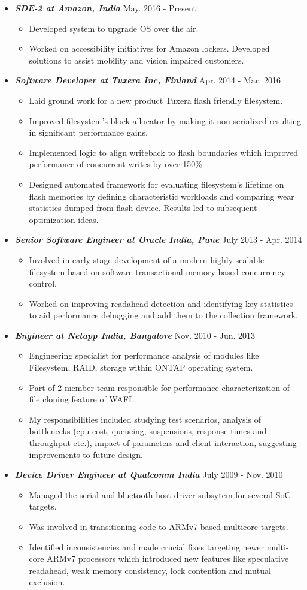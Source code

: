 \documentclass[11pt,oneside]{article}
\newenvironment{msection}[1]{
	\vspace{2pt}
	{\large{\bf \underbar{#1}}}\vskip 1pt
	\vspace{-5pt}
	\begin{itemize}
	\vspace{-5pt}
}{
	\end{itemize}
}
\newenvironment{ssection}[2]{
	\hitem{#1}{#2}
	\vspace{-2pt}
	\begin{itemize}
	\vspace{-2pt}
}{
	\end{itemize}
}
\newcommand{\hitem}[2]{
	\vspace{-4pt}
	\item{\textbf{\em #1} \hfill #2}
}
\newcommand{\itemz}[1]{
	\vspace{-2pt}
	\item[$\bullet$]{#1}
}
\begin{document}
\pagebreak
\begin{msection}{Representative Work}
    \begin{ssection}{SDE-2 at Amazon, India}{May. 2016 - Present}
	\small
	\itemz {Developed system to upgrade OS over the air.}
	\itemz {Worked on accessibility initiatives for Amazon lockers. Developed solutions to assist mobility and vision impaired customers.}
	\end{ssection}
    \begin{ssection}{Software Developer at Tuxera Inc, Finland}{Apr. 2014 - Mar. 2016}
	\small
	\itemz {Laid ground work for a new product Tuxera flash friendly filesystem.}
    \itemz {Improved filesystem's block allocator by making it non-serialized resulting in significant performance gains.} \itemz {Implemented logic to align writeback to flash boundaries which improved performance of concurrent writes by over 150\%.}	
    \itemz {Designed automated framework for evaluating filesystem's lifetime on flash memories by defining characteristic workloads and comparing wear statistics dumped from flash device. Results led to subsequent optimization ideas.}
    \end{ssection}
    \begin{ssection}{Senior Software Engineer at Oracle India, Pune}{July 2013 - Apr. 2014}
		\small
		\itemz {Involved in early stage development of a modern highly scalable filesystem based on software transactional memory based concurrency control.}
		\itemz {Worked on improving readahead detection and identifying key statistics to aid performance debugging and add them to the collection framework.}
	\end{ssection}
    	\begin{ssection}{Engineer at Netapp India, Bangalore}{Nov. 2010 - Jun. 2013}
		\small
		\itemz {Engineering specialist for performance analysis of modules like Filesystem, RAID, storage within ONTAP operating system.}
		\itemz {Part of 2 member team responsible for performance characterization of file cloning feature of WAFL.}
		\itemz {My responsibilities included studying test scenarios, analysis of bottlenecks (cpu cost, queueing, suspensions, response times and throughput etc.), impact of parameters and client interaction, suggesting improvements to future design.}
	\end{ssection}

	\begin{ssection}{Device Driver Engineer at Qualcomm India}{July 2009 - Nov. 2010}
		\small
		\itemz {Managed the serial and bluetooth host driver subsytem for several SoC targets.}
		\itemz {Was involved in transitioning code to ARMv7 based multicore targets.}
		\itemz {Identified inconsistencies and made crucial fixes targeting newer multi-core ARMv7 processors which introduced new features like speculative readahead, weak memory consistency, lock contention and mutual exclusion.}
	\end{ssection}
\end{msection}
\end{document}
